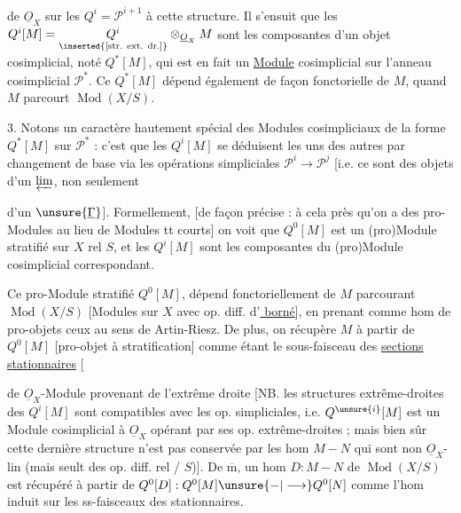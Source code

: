 de $\underline O_X$ sur les $Q^i=\mathcal P^{i+1}$  à cette structure. Il s'ensuit que les
$Q^i[M]=\underset{\inserted{\text{[str. ext. dr.]}}}{Q^i}\otimes_{\underline O_X}M$
sont les composantes d'un objet cosimplicial, noté $Q^*[M]$, qui est en fait un \uline{Module} cosimplicial sur l'anneau cosimplicial $\mathcal P^*$.
Ce $Q^*[M]$ dépend également de façon fonctorielle de $M$, quand $M$ parcourt $\operatorname{Mod}(X/S)$.

3. Notons un caractère hautement spécial des Modules cosimpliciaux de la forme $Q^*[M]$ sur $\mathcal P^*$ :   c'est que les $Q^i[M]$ se déduisent les uns des autres par changement de base via les opérations simpliciales $\mathcal P^i\longrightarrow\mathcal P^j$ [i.e. ce sont des  objets d'un $\varprojlim$, non seulement

d'un $\unsure{\underline\Gamma}$]. Formellement, [de façon précise : à cela près qu'on a des pro-Modules au lieu de Modules tt courts] on voit que $Q^0[M]$ est un (pro)Module stratifié sur $X$ rel $S$, et les $Q^i[M]$ sont les composantes du (pro)Module  cosimplicial correspondant.

Ce pro-Module stratifié $Q^0[M]$,  dépend fonctoriellement de $M$ parcourant $\operatorname{Mod}(X/S)$ [Modules sur $X$ avec op. diff.  d'\uline{ borné}], en prenant comme hom de pro-objets ceux au sens de Artin-Riesz.
De plus, on récupère $M$ à partir de $Q^0[M]$ [pro-objet à stratification] comme étant le sous-faisceau des \uline{sections stationnaires} [

de $\underline O_X$-Module provenant de l'extrême droite
[NB. les structures extrême-droites des $Q^i[M]$ sont compatibles avec les op. simpliciales, i.e. $Q^{\unsure{i}}[M]$ est un Module cosimplicial à $\underline O_X$ opérant par ses op. extrême-droites ; mais bien sûr cette dernière structure n'est pas conservée par les hom $M-N$ qui sont non $\underline O_X$-lin (mais seult des op. diff. rel / $S$)]. De $\overline{\mathrm m}$, un hom $D:M-N$ de $\operatorname{Mod}(X/S)$ est récupéré à partir de $Q^0[D]:Q^0[M]\unsure{-|\longrightarrow}Q^0[N]$ comme l'hom induit sur les ss-faisceaux des  stationnaires.

